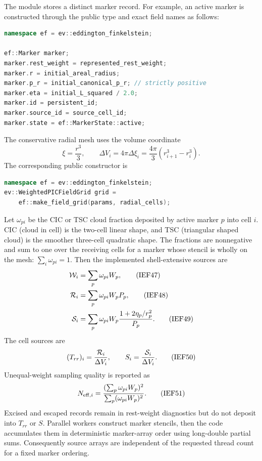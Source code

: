The module stores a distinct marker record.  For example, an active marker is
constructed through the public type and exact field names as follows:
\begin{lstlisting}[language=C++,basicstyle=\ttfamily\scriptsize]
namespace ef = ev::eddington_finkelstein;

ef::Marker marker;
marker.rest_weight = represented_rest_weight;
marker.r = initial_areal_radius;
marker.p_r = initial_canonical_p_r; // strictly positive
marker.eta = initial_L_squared / 2.0;
marker.id = persistent_id;
marker.source_id = source_cell_id;
marker.state = ef::MarkerState::active;
\end{lstlisting}
The conservative radial mesh uses the volume coordinate
\[
 \xi=\frac{r^3}{3},\qquad
 \Delta V_i=4\pi\Delta \xi_i
 =\frac{4\pi}{3}(r_{i+1}^3-r_i^3).                    \tag{IEF46}
\]
The corresponding public constructor is
\begin{lstlisting}[language=C++,basicstyle=\ttfamily\scriptsize]
namespace ef = ev::eddington_finkelstein;
ev::WeightedPICFieldGrid grid =
    ef::make_field_grid(params, radial_cells);
\end{lstlisting}
Let \(\omega_{pi}\) be the CIC or TSC cloud fraction deposited by active
marker \(p\) into cell \(i\).  CIC (cloud in cell) is the two-cell linear
shape, and TSC (triangular shaped cloud) is the smoother three-cell quadratic
shape.  The fractions are nonnegative and sum to one over the receiving
cells for a marker whose stencil is wholly on the mesh:
\(\sum_i\omega_{pi}=1\).  Then the implemented shell-extensive sources
are
\begin{align}
 {\cal W}_i&=\sum_p\omega_{pi}W_p,                     \tag{IEF47}\\
 {\cal R}_i&=\sum_p\omega_{pi}W_pP_p,                  \tag{IEF48}\\
 {\cal S}_i&=\sum_p\omega_{pi}W_p
       \frac{1+2\eta_p/r_p^2}{P_p}.                    \tag{IEF49}
\end{align}
The cell sources are
\[
 (T_{rr})_i=\frac{{\cal R}_i}{\Delta V_i},\qquad
 S_i=\frac{{\cal S}_i}{\Delta V_i}.                   \tag{IEF50}
\]
Unequal-weight sampling quality is reported as
\[
 N_{{\rm eff},i}
 =\frac{(\sum_p\omega_{pi}W_p)^2}
        {\sum_p(\omega_{pi}W_p)^2}.                    \tag{IEF51}
\]
Excised and escaped records remain in rest-weight diagnostics but do not
deposit into \(T_{rr}\) or \(S\).  Parallel workers construct marker stencils,
then the code accumulates them in deterministic marker-array order using
long-double partial sums.  Consequently source arrays are independent of the
requested thread count for a fixed marker ordering.

